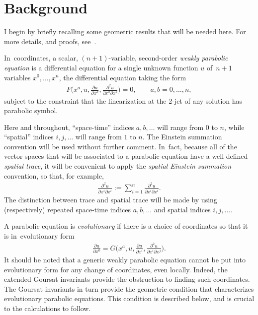\documentclass[pdftex]{sigma}
\newcommand{\pDeriv}[2]{\frac{\partial #1}{\partial #2}}
\numberwithin{equation}{section}
\begin{document}
\section{Background}\label{sec:background}

I begin by briefly recalling some geometric results that will be needed here. For more details, and proofs, see~\cite{McMillan:ParabolicsI}.

In~coordinates, a scalar, $(n+1)$-variable, second-order \emph{weakly parabolic equation} is a differential equation for a single unknown function $u$ of~$n+1$ variables $x^0 , \dots , x^n$, the differential equation taking the form
\begin{gather}\label{eq: generic second order diffeq}
 F\bigg(x^a,u,\pDeriv{u}{x^a},\pDeriv{^2 u}{x^a\partial x^b}\bigg) = 0, \qquad a, b = 0,\dots , n ,
\end{gather}
subject to the constraint that the linearization at the 2-jet of any solution has parabolic symbol.

Here and throughout, ``space-time'' indices $a,b,\dots$ will range from $0$ to $n$, while ``spatial'' indices $i,j,\dots$ will range from $1$ to $n$. The Einstein summation convention will be used without further comment. In~fact, because all of the vector spaces that will be associated to a parabolic equation have a well defined \emph{spatial trace}, it will be convenient to apply the \emph{spatial Einstein summation} convention, so that, for example,
\begin{gather*}
\pDeriv{^2u}{x^i\partial x^i} := \sum_{i=1}^n \pDeriv{^2u}{x^i\partial x^i} .
\end{gather*}
The distinction between trace and spatial trace will be made by using (respectively) repeated space-time indices $a, b, \dots$ and spatial indices $i, j, \dots$.

A parabolic equation is \emph{evolutionary} if there is a choice of coordinates so that it is in~evolutionary form
\begin{gather*}
 \pDeriv{u}{x^0} = G\bigg(x^a,u,\pDeriv{u}{x^i},\pDeriv{^2 u}{x^i\partial x^j}\bigg) .
\end{gather*}
It should be noted that a generic weakly parabolic equation cannot be put into evolutionary form for any change of coordinates, even locally. Indeed, the extended Goursat invariants provide the obstruction to finding such coordinates. The Goursat invariants in turn provide the geometric condition that characterizes evolutionary parabolic equations. This condition is described below, and is crucial to the calculations to follow.
\end{document}
